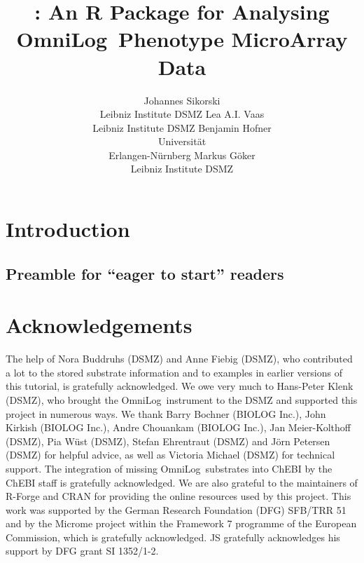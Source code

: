 \documentclass[nojss]{jss}
\author{Johannes Sikorski\\Leibniz Institute DSMZ  \And
        Lea A.I. Vaas\\Leibniz Institute DSMZ \AND
        Benjamin Hofner\\Universit\"{a}t \\Erlangen-N\"{u}rnberg \And
        Markus G\"{o}ker\\Leibniz Institute DSMZ}
\title{\pkg{opm}: An R Package for Analysing OmniLog\textregistered \ Phenotype MicroArray Data}
\begin{document}




\section[Introduction]{Introduction}\label{introduction}

\subsection[Preamble for ``eager to start'' readers]{Preamble for ``eager to start'' readers}\label{preamble}


\section[Acknowledgements]{Acknowledgements}

The help of Nora Buddruhs (DSMZ) and Anne Fiebig (DSMZ), who contributed a lot to the stored substrate information and to examples in earlier versions of this tutorial, is gratefully acknowledged.
We owe very much to Hans-Peter Klenk (DSMZ), who brought the OmniLog\textregistered \ instrument to the DSMZ and supported this project in numerous ways.
We thank Barry Bochner (BIOLOG Inc.), John Kirkish (BIOLOG Inc.), Andre Chouankam (BIOLOG Inc.), Jan Meier-Kolthoff (DSMZ), Pia W\"{u}st (DSMZ), Stefan Ehrentraut (DSMZ) and J\"{o}rn Petersen (DSMZ) for helpful advice, as well as Victoria Michael (DSMZ) for technical support.
The integration of missing OmniLog\textregistered \ substrates into ChEBI by the ChEBI staff is gratefully acknowledged.
We are also grateful to the maintainers of R-Forge and CRAN for providing the online resources used by this project.
This work was supported by the German Research Foundation (DFG) SFB/TRR 51 and by the Microme project within the Framework 7 programme of the European Commission, which is gratefully acknowledged.
JS gratefully acknowledges his support by DFG grant SI 1352/1-2.



\end{document}
